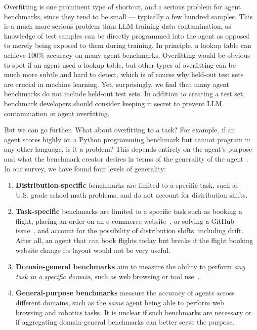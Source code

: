 \documentclass{article}
\begin{document}
Overfitting is one prominent type of shortcut, and a serious problem for agent benchmarks, since they tend to be small --- typically a few hundred samples. This is a much more serious problem than LLM training data contamination, as knowledge of test samples can be directly programmed into the agent as opposed to merely being exposed to them during training. In principle, a lookup table can achieve 100\% accuracy on many agent benchmarks. Overfitting would be obvious to spot if an agent used a lookup table, but other types of overfitting can be much more subtle and hard to detect, which is of course why held-out test sets are crucial in machine learning. Yet, surprisingly, we find that many agent benchmarks do not include held-out test sets. In addition to creating a test set, benchmark developers should consider keeping it secret to prevent LLM contamination or agent overfitting.

But we can go further. What about overfitting to a task? For example, if an agent scores highly on a Python programming benchmark but cannot program in any other language, is it a problem? This depends entirely on the agent's purpose and what the benchmark creator desires in terms of the generality of the agent~\citep{chollet_measure_2019, morris_levels_2024}. In our survey, we have found four levels of generality:
\begin{enumerate}[leftmargin=*]
    \item \textbf{Distribution-specific} benchmarks are limited to a specific task, such as U.S. grade school math problems, and do not account for distribution shifts.
    \item \textbf{Task-specific} benchmarks are limited to a specific task such as booking a flight, placing an order on an e-commerce website~\citep{yao_webshop_2023}, or solving a GitHub issue~\citep{jimenez_swe-bench_2023}, and account for the possibility of distribution shifts, including drift. After all, an agent that can book flights today but breaks if the flight booking website change its layout would not be very useful.
    \item \textbf{Domain-general benchmarks} aim to measure the ability to perform \textit{any task in a specific domain}, such as web browsing or tool use~\citep{zhou_webarena_2024}. 
    \item \textbf{General-purpose benchmarks} measure the accuracy of agents across different domains, such as the \textit{same} agent being able to perform web browsing and robotics tasks. It is unclear if such benchmarks are necessary or if aggregating domain-general benchmarks can better serve the purpose.
\end{enumerate}
\end{document}
